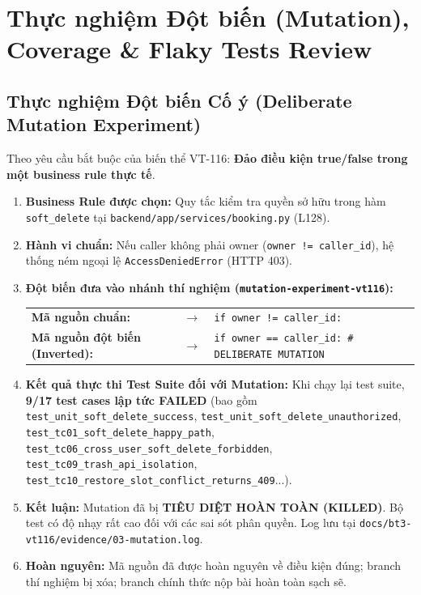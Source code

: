 \documentclass[10pt,a4paper]{article}
\newcommand{\RA}{\ensuremath{\rightarrow}\,}
\newcommand{\codepath}[1]{{\ttfamily\scriptsize\nolinkurl{#1}}}
\begin{document}
\section{Thực nghiệm Đột biến (Mutation), Coverage \& Flaky Tests Review}

\subsection{Thực nghiệm Đột biến Cố ý (Deliberate Mutation Experiment)}
Theo yêu cầu bắt buộc của biến thể VT-116: \textbf{Đảo điều kiện true/false trong một business rule thực tế}.
\begin{enumerate}[leftmargin=1.1em,itemsep=0.3pt]
  \item \textbf{Business Rule được chọn:} Quy tắc kiểm tra quyền sở hữu trong hàm \texttt{soft\_delete} tại \codepath{backend/app/services/booking.py} (L128).
  \item \textbf{Hành vi chuẩn:} Nếu caller không phải owner (\texttt{owner != caller\_id}), hệ thống ném ngoại lệ \texttt{AccessDeniedError} (HTTP 403).
  \item \textbf{Đột biến đưa vào nhánh thí nghiệm (\texttt{mutation-experiment-vt116}):}
    \begin{center}
    \begin{tabularx}{0.9\linewidth}{@{}P{3.8cm}P{0.6cm}Y@{}}
    \textbf{Mã nguồn chuẩn:} & $\RA$ & \texttt{if owner != caller\_id:} \\
    \textbf{Mã nguồn đột biến (Inverted):} & $\RA$ & \texttt{if owner == caller\_id:  \# DELIBERATE MUTATION} \\
    \end{tabularx}
    \end{center}
  \item \textbf{Kết quả thực thi Test Suite đối với Mutation:}
    Khi chạy lại test suite, \textbf{9/17 test cases lập tức FAILED} (bao gồm \texttt{test\_unit\_soft\_delete\_success}, \texttt{test\_unit\_soft\_delete\_unauthorized}, \texttt{test\_tc01\_soft\_delete\_happy\_path}, \texttt{test\_tc06\_cross\_user\_soft\_delete\_forbidden}, \texttt{test\_tc09\_trash\_api\_isolation}, \texttt{test\_tc10\_restore\_slot\_conflict\_returns\_409}...).
  \item \textbf{Kết luận:} Mutation đã bị \textbf{TIÊU DIỆT HOÀN TOÀN (KILLED)}. Bộ test có độ nhạy rất cao đối với các sai sót phân quyền. Log lưu tại \codepath{docs/bt3-vt116/evidence/03-mutation.log}.
  \item \textbf{Hoàn nguyên:} Mã nguồn đã được hoàn nguyên về điều kiện đúng; branch thí nghiệm bị xóa; branch chính thức nộp bài hoàn toàn sạch sẽ.
\end{enumerate}
\end{document}
